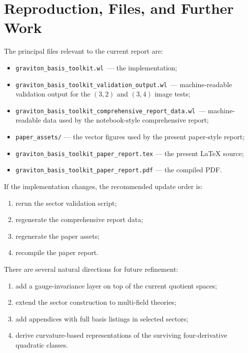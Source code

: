\documentclass[11pt]{report}
\numberwithin{equation}{chapter}
\newcommand{\toolkit}{\texttt{graviton\_basis\_toolkit.wl}}
\newcommand{\reportdata}{\texttt{graviton\_basis\_toolkit\_comprehensive\_report\_data.wl}}
\newcommand{\validationdata}{\texttt{graviton\_basis\_toolkit\_validation\_output.wl}}
\begin{document}
\chapter{Reproduction, Files, and Further Work}

The principal files relevant to the current report are:
\begin{itemize}
\item \toolkit\ --- the implementation;
\item \validationdata\ --- machine-readable validation output for the \((3,2)\) and \((3,4)\) image tests;
\item \reportdata\ --- machine-readable data used by the notebook-style comprehensive report;
\item \texttt{paper\_assets/} --- the vector figures used by the present paper-style report;
\item \texttt{graviton\_basis\_toolkit\_paper\_report.tex} --- the present LaTeX source;
\item \texttt{graviton\_basis\_toolkit\_paper\_report.pdf} --- the compiled PDF.
\end{itemize}

If the implementation changes, the recommended update order is:
\begin{enumerate}[label=\arabic*.]
\item rerun the sector validation script;
\item regenerate the comprehensive report data;
\item regenerate the paper assets;
\item recompile the paper report.
\end{enumerate}

There are several natural directions for future refinement:
\begin{enumerate}[label=\alph*.]
\item add a gauge-invariance layer on top of the current quotient spaces;
\item extend the sector construction to multi-field theories;
\item add appendices with full basis listings in selected sectors;
\item derive curvature-based representations of the surviving four-derivative quadratic classes.
\end{enumerate}
\end{document}
